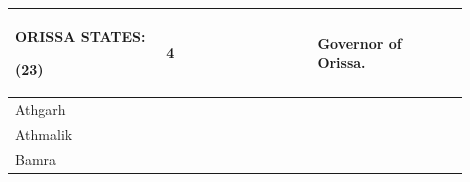 \par\medskip
\begin{longtable}{|p{0.30\linewidth}|p{0.30\linewidth}|p{0.30\linewidth}|}
\hline
ORISSA STATES:

(23)

 & \multirow{24}{*}{





























4

















} & \multirow{24}{*}{





























Governor of Orissa.

















} \\
\hline
Athgarh

 \\
\hline
Athmalik

 \\
\hline
Bamra


\end{longtable}
